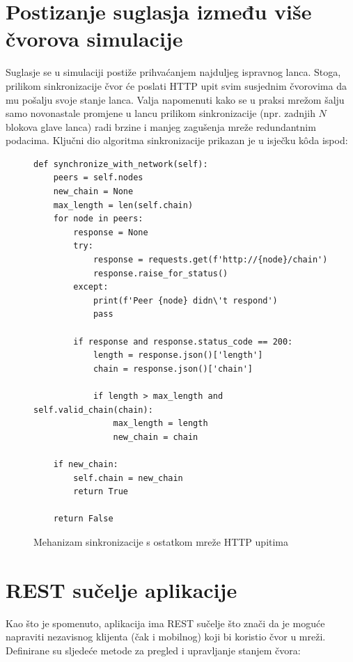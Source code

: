 \documentclass[utf8, zavrsni]{fer}
\begin{document}
\section{Postizanje suglasja između više čvorova simulacije}
Suglasje se u simulaciji postiže prihvaćanjem najduljeg ispravnog lanca. Stoga, prilikom sinkronizacije čvor će poslati HTTP upit svim susjednim čvorovima da mu pošalju svoje stanje lanca. Valja napomenuti kako se u praksi mrežom šalju samo novonastale promjene u lancu prilikom sinkronizacije (npr. zadnjih $ N $ blokova glave lanca) radi brzine i manjeg zagušenja mreže redundantnim podacima. Ključni dio algoritma sinkronizacije prikazan je u isječku kôda ispod:
\begin{figure}[H]
    \centering
\begin{verbatim}
def synchronize_with_network(self):
    peers = self.nodes
    new_chain = None
    max_length = len(self.chain)
    for node in peers:
        response = None
        try:
            response = requests.get(f'http://{node}/chain')
            response.raise_for_status()
        except:
            print(f'Peer {node} didn\'t respond')
            pass

        if response and response.status_code == 200:
            length = response.json()['length']
            chain = response.json()['chain']

            if length > max_length and self.valid_chain(chain):
                max_length = length
                new_chain = chain

    if new_chain:
        self.chain = new_chain
        return True

    return False
\end{verbatim}
    \caption{Mehanizam sinkronizacije s ostatkom mreže HTTP upitima}
    \label{fig:img_suglasje}
\end{figure}

\section{REST sučelje aplikacije}
Kao što je spomenuto, aplikacija ima REST sučelje što znači da je moguće napraviti nezavisnog klijenta (čak i mobilnog) koji bi koristio čvor u mreži. Definirane su sljedeće metode za pregled i upravljanje stanjem čvora:
\end{document}
